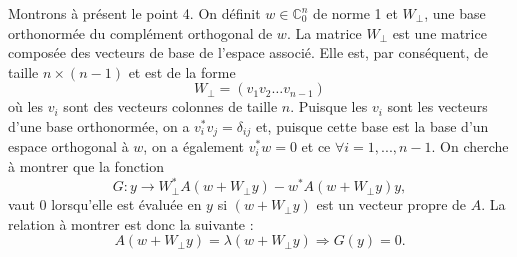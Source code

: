 Montrons à présent le point 4. On définit $w \in \mathbb{C}_0^n$ de norme 1 et $W_{\bot}$, une base orthonormée du complément orthogonal de $w$. La matrice $W_{\bot}$ est une matrice composée des vecteurs de base de l'espace associé. Elle est, par conséquent, de taille $n \times (n-1)$ et est de la forme $$W_{\bot} = (v_1 v_2 \hdots v_{n-1})$$ où les $v_i$ sont des vecteurs colonnes de taille $n$. Puisque les $v_i$ sont les vecteurs d'une base orthonormée, on a $v_i^*v_j = \delta_{ij}$ et, puisque cette base est la base d'un espace orthogonal à $w$, on a également $v_i^*w = 0$ et ce $\forall i = 1,...,n-1$.%
On cherche à montrer que la fonction
\begin{equation} \label{eq_point4_q1}
 G:y \rightarrow W_{\bot}^* A(w+ W_{\bot}y) - w^*A(w+ W_{\bot}y)y,
\end{equation}
vaut $0$ lorsqu'elle est évaluée en $y$ si $(w+ W_{\bot}y)$ est un vecteur propre de $A$. La relation à montrer est donc la suivante : $$A(w+ W_{\bot}y) = \lambda (w+ W_{\bot}y) \Rightarrow G(y)=0.$$

